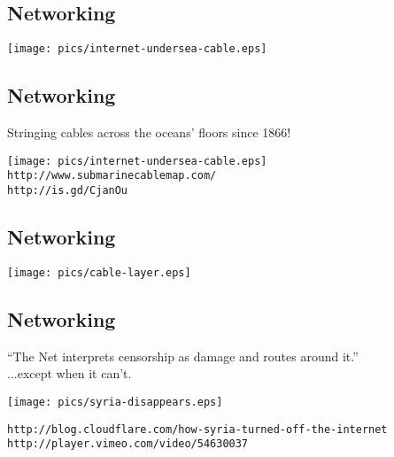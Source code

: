 \documentclass[xga]{xdvislides}
\begin{document}
\subsection{Networking}
\vspace*{\fill}
\begin{center}
	\texttt{[image: pics/internet-undersea-cable.eps]} \\
\end{center}
\vspace*{\fill}


\subsection{Networking}
Stringing cables across the oceans' floors since 1866!
\vspace*{\fill}
\begin{center}
	\texttt{[image: pics/internet-undersea-cable.eps]} \\
	\verb+http://www.submarinecablemap.com/+ \\
	\verb+http://is.gd/CjanOu+
\end{center}
\vspace*{\fill}

\subsection{Networking}
\vspace*{\fill}
\begin{center}
	\texttt{[image: pics/cable-layer.eps]} \\
\end{center}
\vspace*{\fill}

\subsection{Networking}
``The Net interprets censorship as damage and routes around it.'' \\

...except when it can't.

\begin{center}
\vspace*{\fill}
	\texttt{[image: pics/syria-disappears.eps]} \\
\vspace*{\fill}

{\tt http://blog.cloudflare.com/how-syria-turned-off-the-internet} \\
{\tt http://player.vimeo.com/video/54630037}
\end{center}
\end{document}
